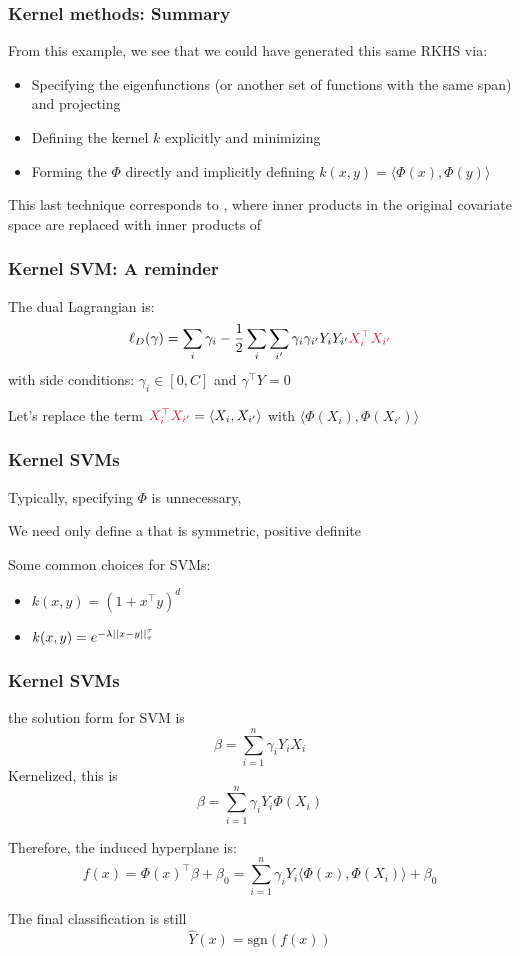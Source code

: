 \documentclass[12pt]{beamer}
\begin{document}
\begin{frame}
\frametitle{Kernel methods: Summary}
From this example, we see that we could have generated this same RKHS via:
\begin{itemize}
\item Specifying the eigenfunctions (or another set of functions with the same span) and projecting
\item Defining the kernel $k$ explicitly and minimizing
\item Forming the  $\Phi$ directly and implicitly defining $k(x,y) = \langle\Phi(x),\Phi(y)\rangle$
\end{itemize}
This last technique corresponds to , where inner products in the original covariate
space are replaced with inner products of 
\end{frame}

\begin{frame}
\frametitle{Kernel SVM: A reminder}
The dual Lagrangian is:
\[
\ell_D(\gamma) = \sum_i \gamma_i - \frac{1}{2}\sum_i \sum_{i'} \gamma_i \gamma_{i'} Y_i Y_{i'} \alr{X_i^{\top}X_{i'}}
\]
with side conditions: $\gamma_i \in [0,C]$ and $\gamma^{\top}Y = 0$

\vsp
Let's replace the term $\alr{X_i^{\top}X_{i'}} = \langle X_i, X_{i'} \rangle$ with
$\langle \Phi(X_i), \Phi(X_{i'}) \rangle$

\end{frame}

\begin{frame}
\frametitle{Kernel SVMs}
Typically, specifying $\Phi$ is unnecessary, 

\vsp
We need only define a  that is symmetric, positive definite

\vsp
Some common choices for SVMs:
\begin{itemize}
\item {} $k(x,y) = (1 + x^{\top}y)^d$
\item {} $k(x,y) = e^{-\lambda \left|\left| x-y \right|\right|_{\tau}^\tau}$
\end{itemize}
\end{frame}

\begin{frame}
\frametitle{Kernel SVMs}
 the solution form for SVM is
\[
\beta = \sum_{i=1}^n \gamma_i Y_i X_i
\]
Kernelized, this is
\[
\beta = \sum_{i=1}^n \gamma_i Y_i \Phi(X_i)
\]

\vsp
Therefore, the induced hyperplane is:
\[
f(x) = \Phi(x)^{\top} \beta + \beta_0 = \sum_{i=1}^n \gamma_i Y_i \langle \Phi(x), \Phi(X_i) \rangle + \beta_0
\]

\vsp
The final classification is still
\[
\hat{Y}(x) = \textrm{sgn}(f(x)) 
\]

\end{frame}
\end{document}
